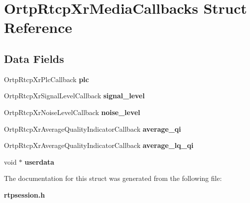 \section{Ortp\+Rtcp\+Xr\+Media\+Callbacks Struct Reference}
\label{structOrtpRtcpXrMediaCallbacks}
\subsection*{Data Fields}
\begin{DoxyCompactItemize}
\item 
\mbox{\label{structOrtpRtcpXrMediaCallbacks_adb9b0b0ebad4490af00af5759415a4f1}} 
Ortp\+Rtcp\+Xr\+Plc\+Callback {\bfseries plc}
\item 
\mbox{\label{structOrtpRtcpXrMediaCallbacks_ae84929df6194d6fe71cce416eefc0c8f}} 
Ortp\+Rtcp\+Xr\+Signal\+Level\+Callback {\bfseries signal\+\_\+level}
\item 
\mbox{\label{structOrtpRtcpXrMediaCallbacks_a3813ede607a2e2ff1300acf8d5826a40}} 
Ortp\+Rtcp\+Xr\+Noise\+Level\+Callback {\bfseries noise\+\_\+level}
\item 
\mbox{\label{structOrtpRtcpXrMediaCallbacks_a5de0421a944b66fa269f5bb22be6a01c}} 
Ortp\+Rtcp\+Xr\+Average\+Quality\+Indicator\+Callback {\bfseries average\+\_\+qi}
\item 
\mbox{\label{structOrtpRtcpXrMediaCallbacks_acd44e74f6e45b38dead3e659160a54f8}} 
Ortp\+Rtcp\+Xr\+Average\+Quality\+Indicator\+Callback {\bfseries average\+\_\+lq\+\_\+qi}
\item 
\mbox{\label{structOrtpRtcpXrMediaCallbacks_ab5992b358c71afdc0d2463e2b6c20f6d}} 
void $\ast$ {\bfseries userdata}
\end{DoxyCompactItemize}


The documentation for this struct was generated from the following file\+:\begin{DoxyCompactItemize}
\item 
\textbf{ rtpsession.\+h}\end{DoxyCompactItemize}

